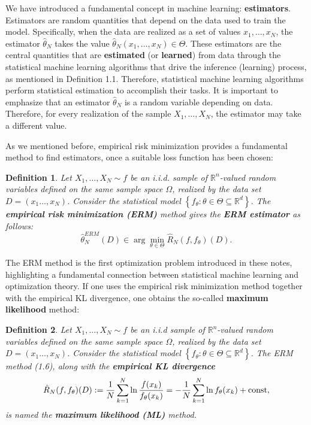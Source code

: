 \documentclass{report}
\newtheorem{definition}{Definition}[chapter]
\begin{document}
We have introduced a fundamental concept in machine learning: \textbf{estimators}. Estimators are random quantities that depend on the data used to train the model. Specifically, when the data are realized as a set of values $x_1,\dots,x_N$, the estimator $\hat{\theta}_N$ takes the value $\hat{\theta}_N(x_1,\dots,x_N) \in \Theta$. These estimators are the central quantities that are \textbf{estimated} (or \textbf{learned}) from data through the statistical machine learning algorithms that drive the inference (learning) process, as mentioned in Definition 1.1. Therefore, statistical machine learning algorithms perform statistical estimation to accomplish their tasks. It is important to emphasize that an estimator $\hat{\theta}_N$ is a random variable depending on data. Therefore, for
every realization of the sample $X_1,\dots,X_N$, the estimator may take a different value.

As we mentioned before, empirical risk minimization provides a fundamental method to find estimators, once a suitable loss function has been chosen:
\begin{definition}
Let $X_1,\dots,X_N \sim f$ be an i.i.d. sample of $\mathbb{R}^n$-valued random variables defined on the same sample space $\Omega$, realized by the data set $D =(x_1\dots,x_N)$. Consider the statistical model $\left\{f_\theta : \theta \in \Theta \subseteq \mathbb{R}^d\right\}$. The \textbf{empirical risk minimization (ERM)} method gives the \textbf{ERM estimator} as follows:
\begin{equation}
\hat{\theta}^{ERM}_N(D) \in \arg\min_{\theta \in \Theta}\hat{R}_N(f,f_\theta)(D).
\end{equation}
\end{definition}

The ERM method is the first optimization problem introduced in these notes, highlighting a fundamental connection between statistical machine learning and optimization theory. If one uses the empirical risk minimization method together with the empirical KL divergence, one obtains the so-called \textbf{maximum likelihood} method:

\begin{definition}
Let $X_1,\dots,X_N \sim f$ be an i.i.d sample of $\mathbb{R}^n$-valued random variables defined on the same sample space $\Omega$, realized by the data set $D=(x_1\dots,x_N)$. Consider the statistical model $\left\{f_\theta : \theta \in \Theta \subseteq \mathbb{R}^d\right\}$. The ERM method (1.6), along with the \textbf{empirical KL divergence}
\begin{equation}
\hat{R}_N(f,f_\theta)(D) := \frac{1}{N}\sum_{k=1}^{N}\ln\frac{f(x_k)}{f_\theta(x_k)} = -\frac{1}{N}\sum_{k=1}^{N}\ln f_\theta(x_k) + \textup{const},
\end{equation}
is named the \textbf{maximum likelihood (ML)} method.
\end{definition}
\end{document}
